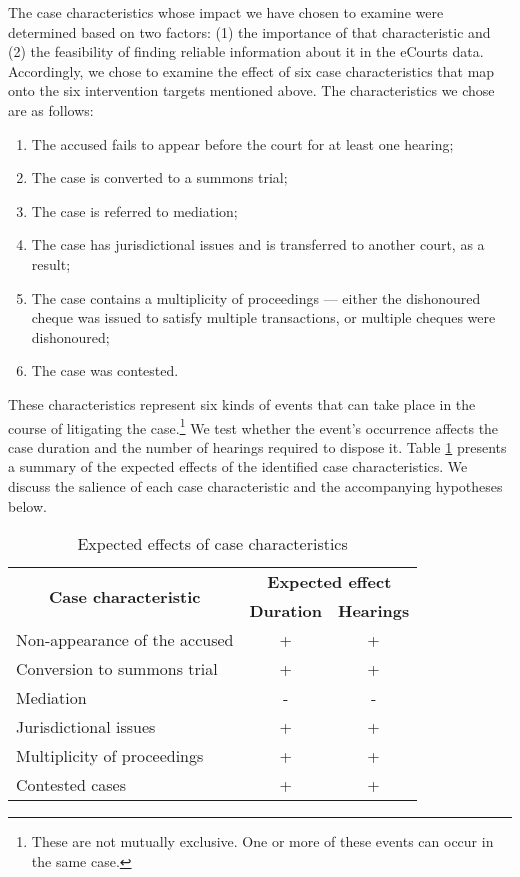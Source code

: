 The case characteristics whose impact we have chosen to examine were determined based on two factors: (1) the importance of that characteristic and (2) the feasibility of finding reliable information about it in the eCourts data. Accordingly, we chose to examine the effect of six case characteristics that map onto the six intervention targets mentioned above. The characteristics we chose are as follows:
\begin{enumerate}
\item The accused fails to appear before the court for at least one hearing;
\item The case is converted to a summons trial;
\item The case is referred to mediation;
\item The case has jurisdictional issues and is transferred to another court, as a result;
\item The case contains a multiplicity of proceedings --- either the dishonoured cheque was issued to satisfy multiple transactions, or multiple cheques were dishonoured;
\item The case was contested.
\end{enumerate}

These characteristics represent six kinds of events that can take place in the course of litigating the case.\footnote{These are not mutually exclusive. One or more of these events can occur in the same case.} We test whether the event's occurrence affects the case duration and the number of hearings required to dispose it. Table \ref{tab:expected} presents a summary of the expected effects of the identified case characteristics. We discuss the salience of each case characteristic and the accompanying hypotheses below.

\begin{longtable}{@{}lcc@{}}
\caption{Expected effects of case characteristics}
\label{tab:expected}\\
\toprule
\multicolumn{1}{c}{\multirow{2}{*}{\textbf{Case characteristic}}} & \multicolumn{2}{c}{\textbf{Expected effect}} \\ \cmidrule(l){2-3} 
\multicolumn{1}{c}{} & \textbf{Duration} & \textbf{Hearings} \\ \midrule
Non-appearance of the accused & + & + \\
Conversion to summons trial & + & + \\
Mediation & - & - \\
Jurisdictional issues & + & + \\
Multiplicity of proceedings & + & + \\
Contested cases & + & + \\ \bottomrule
\end{longtable}

